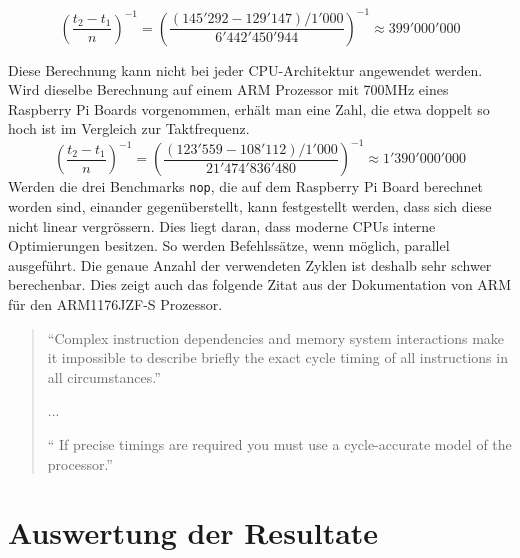 \[ \left(\frac{t_2-t_1}{n}\right)^{-1} =  \left(\frac{(145'292-129'147)/1'000}{6'442'450'944}\right)^{-1} \approx 399'000'000 \]

Diese Berechnung kann nicht bei jeder CPU-Architektur angewendet werden. Wird dieselbe Berechnung auf einem ARM Prozessor mit 700MHz eines Raspberry Pi Boards vorgenommen, erhält man eine Zahl, die etwa doppelt so hoch ist im Vergleich zur Taktfrequenz.
\[ \left(\frac{t_2-t_1}{n}\right)^{-1} =  \left(\frac{(123'559-108'112)/1'000}{21'474'836'480}\right)^{-1} \approx 1'390'000'000 \]
Werden die drei Benchmarks \texttt{nop}, die auf dem Raspberry Pi Board berechnet worden sind, einander gegenüberstellt, kann festgestellt werden, dass sich diese nicht linear vergrössern. Dies liegt daran, dass moderne CPUs interne Optimierungen besitzen. So werden Befehlssätze, wenn möglich, parallel ausgeführt. Die genaue Anzahl der verwendeten Zyklen ist deshalb sehr schwer berechenbar. Dies zeigt auch das folgende Zitat aus der Dokumentation von ARM für den ARM1176JZF-S Prozessor.

\begin{quotation}
\enquote{Complex instruction dependencies and memory system interactions make it impossible to
describe briefly the exact cycle timing of all instructions in all circumstances.}
\par
...
\par
\enquote{ If precise timings are required you must use a cycle-accurate model of the processor.\cite{arm_datasheet}}
\end{quotation}



\section{Auswertung der Resultate}
\label{sec:auswertung_resultate}

